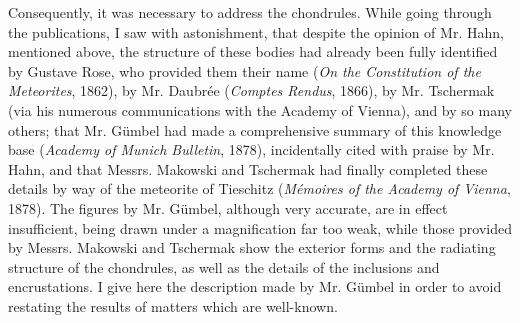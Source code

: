 \documentclass[a4paper, 12pt, oneside]{article}
\begin{document}
Consequently, it was necessary to address the chondrules. While going through the publications, I saw with astonishment, that despite the opinion of Mr. Hahn, mentioned above, the structure of these bodies had already been fully identified by Gustave Rose, who provided them their name (\emph{On the Constitution of the Meteorites}, 1862), by Mr. Daubrée (\emph{Comptes Rendus}, 1866), by Mr. Tschermak (via his numerous communications with the Academy of Vienna), and by so many others; that Mr. Gümbel had made a comprehensive summary of this knowledge base (\emph{Academy of Munich Bulletin}, 1878), incidentally cited with praise by Mr. Hahn, and that Messrs. Makowski and Tschermak had finally completed these details by way of the meteorite of Tieschitz (\emph{Mémoires of the Academy of Vienna}, 1878). The figures by Mr. Gümbel, although very accurate, are in effect insufficient, being drawn under a magnification far too weak, while those provided by Messrs. Makowski and Tschermak show the exterior forms and the radiating structure of the chondrules, as well as the details of the inclusions and encrustations. I give here the description made by Mr. Gümbel in order to avoid restating the results of matters which are well-known.
\end{document}
